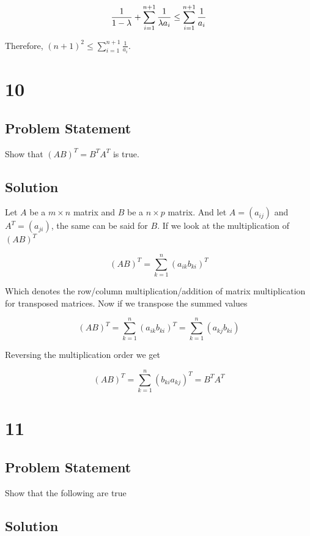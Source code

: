 \documentclass[11pt,a4paper,final]{article}
\begin{document}
\begin{equation*}
\frac{1}{1-\lambda} + \sum_{i=1}^{n+1} \frac{1}{\lambda a_i} \le \sum_{i=1}^{n+1} \frac{1}{a_i} \\
\end{equation*}

Therefore, \((n+1)^2 \le \sum_{i=1}^{n+1} \frac{1}{a_i}\).

\section{10}
\label{sec:orgefd82ba}
\subsection{Problem Statement}
\label{sec:org26caa07}
Show that \((AB)^T = B^T A^T\) is true.

\subsection{Solution}
\label{sec:orgb82f68d}
Let \(A\) be a \(m \times n\) matrix and \(B\) be a \(n \times p\) matrix. And let \(A = (a_{ij})\) and \(A^T = (a_{ji})\), the same can be
said for \(B\). If we look at the multiplication of \((AB)^T\)

$$
(AB)^T = \sum_{k=1}^n (a_{ik} b_{ki})^T
$$

Which denotes the row/column multiplication/addition of matrix multiplication for transposed matrices. Now if we
transpose the summed values

$$
(AB)^T = \sum_{k=1}^n (a_{ik} b_{ki})^T = \sum_{k=1}^n (a_{kj} b_{ki})
$$

Reversing the multiplication order we get

$$
(AB)^T = \sum_{k=1}^n (b_{ki} a_{kj})^T = B^T A^T
$$

\section{11}
\label{sec:orgff45df0}
\subsection{Problem Statement}
\label{sec:org6d6e416}
Show that the following are true

\subsection{Solution}
\label{sec:org7ab93fc}
\end{document}
